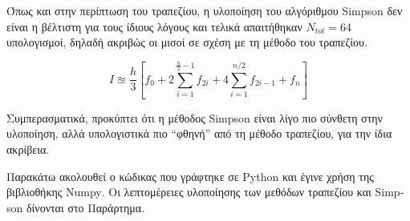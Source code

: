 \documentclass[assignment4.tex]{subfiles}
\begin{document}
Όπως και στην περίπτωση του τραπεζίου, η υλοποίηση του αλγόριθμου \textlatin{Simpson} δεν είναι η βέλτιστη για τους ίδιους λόγους και τελικά απαιτήθηκαν $N_{tot}=64$ υπολογισμοί, δηλαδή ακριβώς οι μισοί σε σχέση με τη μέθοδο του τραπεζίου.

\begin{equation}
I \approxeq \frac{h}{3}\left[ f_0 + 2\sum_{i=1}^{\frac{n}{2}-1}f_{2i} + 4\sum_{i=1}^{n/2}f_{2i-1} + f_n \right]
\label{eq:simpson_moment}
\end{equation}

Συμπερασματικά, προκύπτει ότι η μέθοδος \textlatin{Simpson} είναι λίγο πιο σύνθετη στην υλοποίηση, αλλά υπολογιστικά πιο ``φθηνή'' από τη μέθοδο τραπεζίου, για την ίδια ακρίβεια.

Παρακάτω ακολουθεί ο κώδικας που γράφτηκε σε \textlatin{Python} και έγινε χρήση της βιβλιοθήκης \textlatin{Numpy}. Οι λεπτομέρειες υλοποίησης των μεθόδων τραπεζίου και \textlatin{Simpson} δίνονται στο Παράρτημα.

\end{document}
